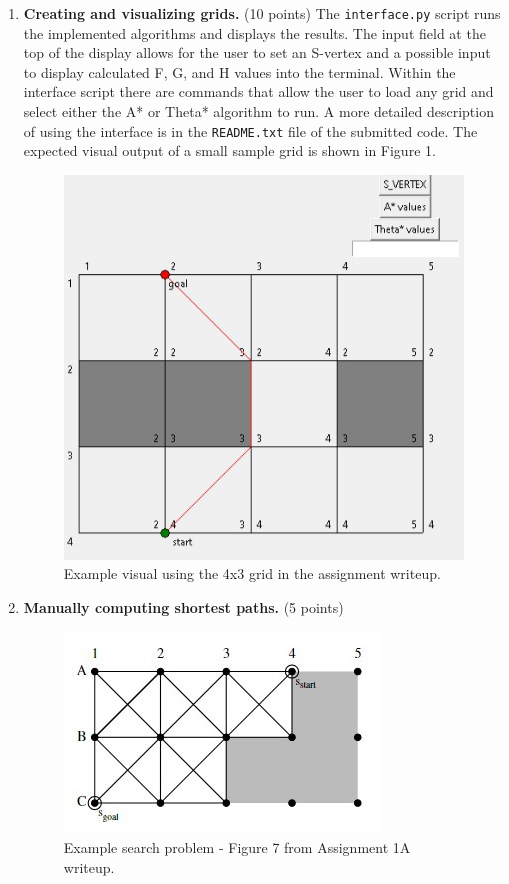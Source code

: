\documentclass[12pt]{article}
\begin{document}
\begin{enumerate}[label=(\alph*)]

  
  \item \textbf{Creating and visualizing grids.} (10 points) The \texttt{interface.py} script runs the implemented algorithms and displays the results. The input field at the top of the display allows for the user to set an S-vertex and a possible input to display calculated F, G, and H values into the terminal. Within the interface script there are commands that allow the user to load any grid and select either the A* or Theta* algorithm to run. A more detailed description of using the interface is in the \texttt{README.txt} file of the submitted code. The expected visual output of a small sample grid is shown in  Figure 1.

  \begin{figure}[h]
    \centering
    \includegraphics[scale=0.85]{homework1/images/testingscreenshots/interface.jpg}
	\caption{Example visual using the 4x3 grid in the assignment writeup.}
	\label{fig:fig1}
  \end{figure}

  \item \textbf{Manually computing shortest paths.} (5 points) 

  \begin{figure}[h]
    \centering
    \includegraphics[scale=1.2]{homework1/images/probdescrips/figure7original.jpg}
	\caption{Example search problem - Figure 7 from Assignment 1A writeup.}
	\label{fig:fig2}
  \end{figure}


\end{enumerate}
\end{document}

